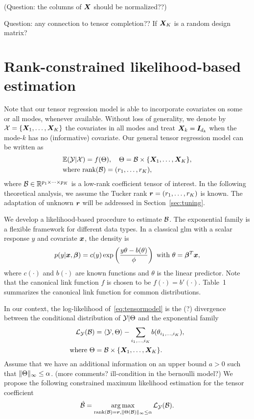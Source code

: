 \documentclass[twoside]{article}
\theoremstyle{plain}
\theoremstyle{definition}
\begin{document}
(Question: the columns of $\bm X$ should be normalized??)

Question: any connection to tensor completion?? If $\bm X_K$ is a random design matrix? 

\section{Rank-constrained likelihood-based estimation}
Note that our tensor regression model is able to incorporate covariates on some or all modes, whenever available. Without loss of generality, we denote by $\mathcal{X}=\{\bm X_1,\ldots,\bm X_K\}$ the covariates in all modes and treat $\bm X_k=\bm I_{d_k}$ when the mode-$k$ has no (informative) covariate. Our general tensor regression model can be written as
\begin{align}\label{eq:tensormodel}
&\mathbb{E}(\mathcal{Y}|\mathcal{X})=f(\Theta),\quad \Theta =\mathcal{B}\times\{\bm X_1,\ldots,\bm X_K\},\notag\\
&\text{where}\ \text{rank}(\mathcal{B})=(r_1,\ldots,r_K),
\end{align}
where $\mathcal{B}\in\mathbb{R}^{p_1\times \cdots\times p_K}$ is a low-rank coefficient tensor of interest. In the following theoretical analysis, we assume the Tucker rank $\bm{r}=(r_1,\ldots,r_K)$ is known. The adaptation of unknown $\bm{r}$ will be addressed in Section~\ref{sec:tuning}. 

We develop a likelihood-based procedure to estimate $\mathcal{B}$. The exponential family is a flexible framework for different data types. In a classical glm with a scalar response $y$ and covariate $\bm x$, the density is 
\[
p(y|\bm x, \boldsymbol{\beta})=c(y)\exp\left({y\theta- b(\theta) \over \phi}\right)\ \text{with}\ \theta=\boldsymbol{\beta}^T\bm x,
\]
where $c(\cdot)$ and $b(\cdot)$ are known functions and $\theta$ is the linear predictor. Note that the canonical link function $f$ is chosen to be $f(\cdot)=b'(\cdot)$. Table~1 summarizes the canonical link function for common distributions. 

In our context, the log-likelihood of~\eqref{eq:tensormodel} is the (?) divergence between the conditional distribution of $\mathcal{Y}|\Theta$ and the exponential family
\begin{align}
\mathcal{L}_{\mathcal{Y}}(\mathcal{B})&=\langle \mathcal{Y}, \Theta \rangle - \sum_{i_1,\ldots,i_K} b(\theta_{i_1,\ldots,i_K}),\\
\text{where}\ \Theta&=\mathcal{B}\times\{\bm X_1,\ldots,\bm X_K\}.
\end{align}
Assume that we have an additional information on an upper bound $a>0$ such that $\lVert\Theta\rVert_\infty\leq \alpha$. (more comments? ill-condition in the bernoulli model?)
We propose the following constrained maximum likelihood estimation for the tensor coefficient
\[
\hat {\mathcal{B}}=\operatorname*{arg\,max}_{\text{rank}(\mathcal{B})= \bm{r}, \lVert\Theta(\mathcal{B})\rVert_\infty\leq \alpha} \mathcal{L}_{\mathcal{Y}}(\mathcal{B}).
\]
\end{document}
